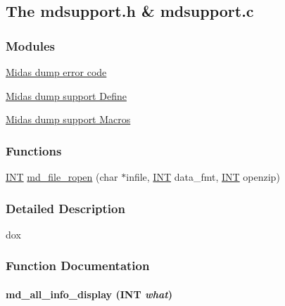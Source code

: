 \subsection{The mdsupport.h \& mdsupport.c}
\label{group__mdsupportincludecode}
\subsubsection*{Modules}
\begin{DoxyCompactItemize}
\item 
\hyperlink{group__mdsupporterrorh}{Midas dump error code}
\item 
\hyperlink{group__mdsupportdefineh}{Midas dump support Define}
\item 
\hyperlink{group__mdsupportmacroh}{Midas dump support Macros}
\end{DoxyCompactItemize}
\subsubsection*{Functions}
\begin{DoxyCompactItemize}
\item 
\hyperlink{vppg_8h_a392e62da233ed3e2f7c3fd4f487a3896}{INT} \hyperlink{group__mdsupportincludecode_ga133a44577a83b8b79a5fe481b3664101}{md\_\-file\_\-ropen} (char $\ast$infile, \hyperlink{vppg_8h_a392e62da233ed3e2f7c3fd4f487a3896}{INT} data\_\-fmt, \hyperlink{vppg_8h_a392e62da233ed3e2f7c3fd4f487a3896}{INT} openzip)
\end{DoxyCompactItemize}


\subsubsection{Detailed Description}
dox 

\subsubsection{Function Documentation}
\paragraph[{md\_\-all\_\-info\_\-display}]{ md\_\-all\_\-info\_\-display ({\bf INT} {\em what})}\hfill\label{group__mdsupportincludecode_ga3a914ae0c86b0664ce393ef9c1330a6d}


